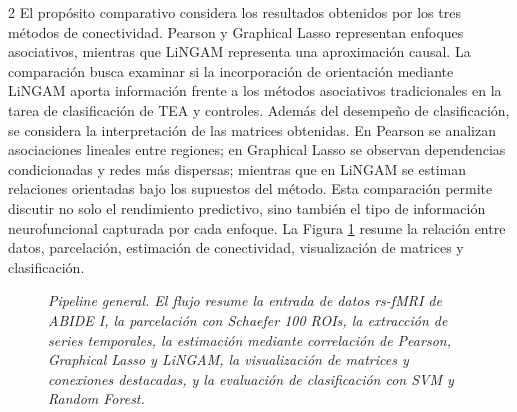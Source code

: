\documentclass[12pt,letterpaper]{article}
\begin{document}
\begin{multicols}{2}
El propósito comparativo considera los resultados obtenidos por los tres métodos de
conectividad. Pearson y Graphical Lasso representan enfoques asociativos,
mientras que LiNGAM representa una aproximación causal. La
comparación busca examinar si la incorporación de orientación mediante LiNGAM
aporta información frente a los métodos asociativos tradicionales en la tarea de
clasificación de TEA y controles. Además del desempeño de clasificación, se considera la interpretación de
las matrices obtenidas. En Pearson se analizan asociaciones lineales
entre regiones; en Graphical Lasso se observan dependencias
condicionadas y redes más dispersas; mientras que en LiNGAM se estiman
relaciones orientadas bajo los supuestos del método. Esta comparación
permite discutir no solo el rendimiento predictivo, sino también el tipo
de información neurofuncional capturada por cada enfoque. La Figura
\ref{fig:pipeline_general} resume la relación entre datos, parcelación,
estimación de conectividad, visualización de matrices y clasificación.



\end{multicols}

\begin{figure}[H]
\centering
\shorthandoff{>} %

\shorthandon{>} %
\caption[Pipeline general del an\'alisis de conectividad]{\textit{Pipeline general. El flujo resume la entrada de datos rs-fMRI de ABIDE I, la parcelación con Schaefer 100 ROIs, la extracción de series temporales, la estimación mediante correlación de Pearson, Graphical Lasso y LiNGAM, la visualización de matrices y conexiones destacadas, y la evaluación de clasificación con SVM y Random Forest.}}
\label{fig:pipeline_general}
\end{figure}

\rmfamily
\fontsize{9}{11}\selectfont
\setlength{\parskip}{5pt}
\justify
\end{document}
